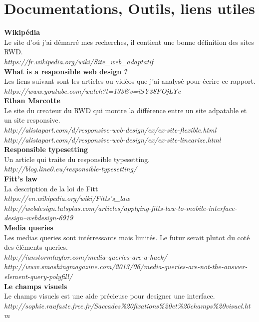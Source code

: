 \documentclass{article}
\begin{document}
\section{Documentations, Outils, liens utiles} 
\textbf{Wikip\'edia}\\
Le site d'o\'u j'ai d\'emarr\'e mes recherches, il contient une bonne d\'efinition des sites RWD.\\
\textit{https://fr.wikipedia.org/wiki/Site\_web\_adaptatif}
\vspace{0.5cm}\\
\textbf{What is a responsible web design ?}\\
Les liens suivant sont les articles ou vid\'eos que j'ai analys\'e pour \'ecrire ce rapport.\\
\textit{https://www.youtube.com/watch?t=133\&v=iSY38POjLYc}
\vspace{0.5cm}\\
\textbf{Ethan Marcotte}\\
Le site du createur du RWD qui montre la diff\'erence entre un site adpatable et un site responsive.\\
\textit{http://alistapart.com/d/responsive-web-design/ex/ex-site-flexible.html}\\
\textit{http://alistapart.com/d/responsive-web-design/ex/ex-site-linearize.html}
\vspace{0.5cm}\\
\textbf{Responsible typesetting}\\
Un article qui traite du responsible typesetting.\\
\textit{http://blog.line0.eu/responsible-typesetting/}
\vspace{0.5cm}\\
\textbf{Fitt's law}\\
La description de la loi de Fitt\\
\textit{https://en.wikipedia.org/wiki/Fitts's\_law}\\
\textit{http://webdesign.tutsplus.com/articles/applying-fitts-law-to-mobile-interface-design--webdesign-6919}
\vspace{0.5cm}\\
\textbf{Media queries}\\
Les medias queries sont int\'erressants mais limit\'es. Le futur serait plutot du cot\'e des \'el\'ements queries.\\
\textit{http://ianstormtaylor.com/media-queries-are-a-hack/}\\
\textit{http://www.smashingmagazine.com/2013/06/media-queries-are-not-the-answer-element-query-polyfill/}
\vspace{0.5cm}\\
\textbf{Le champs visuels}\\
Le champs visuels est une aide pr\'ecieuse pour designer une interface.\\
\textit{http://sophie.raufaste.free.fr/Saccades\%20fixations\%20et\%20champs\%20visuel.htm}\\
\end{document}
